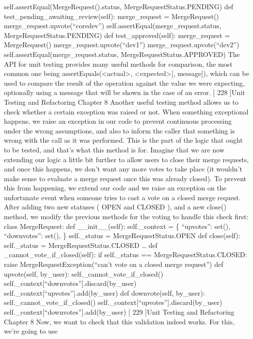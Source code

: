 \documentclass[a4paper,10pt,english]{sphinxmanual}
\begin{document}
self.assertEqual(MergeRequest().status, MergeRequestStatus.PENDING)
def test\_pending\_awaiting\_review(self):
merge\_request = MergeRequest()
merge\_request.upvote(“core\sphinxhyphen{}dev”)
self.assertEqual(merge\_request.status, MergeRequestStatus.PENDING)
def test\_approved(self):
merge\_request = MergeRequest()
merge\_request.upvote(“dev1”)
merge\_request.upvote(“dev2”)
self.assertEqual(merge\_request.status, MergeRequestStatus.APPROVED)
The API for unit testing provides many useful methods for comparison, the most common
one being assertEquals(\textless{}actual\textgreater{}, \textless{}expected\textgreater{}{[}, message{]}), which can be used to
compare the result of the operation against the value we were expecting, optionally using a
message that will be shown in the case of an error.
{[} 228 {]}Unit Testing and Refactoring
Chapter 8
Another useful testing method allows us to check whether a certain exception was raised or
not. When something exceptional happens, we raise an exception in our code to prevent
continuous processing under the wrong assumptions, and also to inform the caller that
something is wrong with the call as it was performed. This is the part of the logic that ought
to be tested, and that’s what this method is for.
Imagine that we are now extending our logic a little bit further to allow users to close their
merge requests, and once this happens, we don’t want any more votes to take place (it
wouldn’t make sense to evaluate a merge request once this was already closed). To prevent
this from happening, we extend our code and we raise an exception on the unfortunate
event when someone tries to cast a vote on a closed merge request.
After adding two new statuses ( OPEN and CLOSED ), and a new close() method, we
modify the previous methods for the voting to handle this check first:
class MergeRequest:
def \_\_init\_\_(self):
self.\_context = \{
“upvotes”: set(),
“downvotes”: set(),
\}
self.\_status = MergeRequestStatus.OPEN
def close(self):
self.\_status = MergeRequestStatus.CLOSED
…
def \_cannot\_vote\_if\_closed(self):
if self.\_status == MergeRequestStatus.CLOSED:
raise MergeRequestException(“can’t vote on a closed merge
request”)
def upvote(self, by\_user):
self.\_cannot\_vote\_if\_closed()
self.\_context{[}“downvotes”{]}.discard(by\_user)
self.\_context{[}“upvotes”{]}.add(by\_user)
def downvote(self, by\_user):
self.\_cannot\_vote\_if\_closed()
self.\_context{[}“upvotes”{]}.discard(by\_user)
self.\_context{[}“downvotes”{]}.add(by\_user)
{[} 229 {]}Unit Testing and Refactoring
Chapter 8
Now, we want to check that this validation indeed works. For this, we’re going to use
\end{document}
